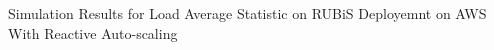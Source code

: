 \label{reactive} Simulation Results for Load Average Statistic on RUBiS Deployemnt on AWS With Reactive Auto-scaling